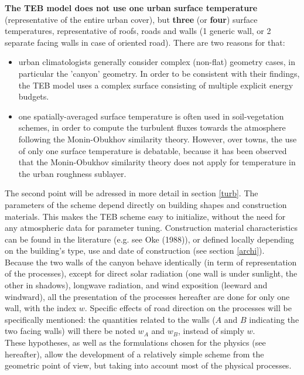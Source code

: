 {\bf The TEB model
does not use one urban surface temperature} (representative of the 
entire urban cover), but {\bf three} (or {\bf four}) surface temperatures,
representative of roofs, roads and walls (1 generic wall, or 2 separate facing walls in case of oriented road). There are two reasons for that:
\begin{itemize}
\item urban climatologists generally consider complex (non-flat) geometry
cases, in particular the 'canyon' geometry. In order to be consistent with
their findings, the TEB model uses a complex surface consisting of
multiple explicit energy budgets.
\item one spatially-averaged surface temperature is often used in
soil-vegetation schemes, in order to compute the turbulent fluxes towards
the atmosphere following the Monin-Obukhov similarity theory.
However, over towns, 
the use of only one surface temperature is debatable, because
it has been observed that the Monin-Obukhov similarity theory does not
apply for temperature in the urban roughness sublayer.
\end{itemize}
The second point will be adressed in more detail in section \ref{turb}.
The parameters of the scheme depend directly on building shapes
and construction materials. This makes the TEB scheme easy to initialize,
without the need for any atmospheric data for parameter tuning. Construction
material characteristics can be found in the literature (e.g. see Oke (1988)\nocite{Oke1988}), or defined locally depending on the building's type, use and date of construction (see section \ref{archi}).
\\

Because the two walls of the canyon behave identically (in term of representation of the processes), except for direct solar radiation (one wall is under sunlight, the other in shadows), longwave radiation, and wind exposition (leeward and windward), all the presentation of the processes hereafter are done for only one wall, with the index $w$. Specific effects of road direction on the processes will be specifically mentioned: the quantities related to the walls ($A$ and $B$ indicating the two facing walls) will there be noted $w_A$ and $w_B$, instead of simply $w$.\\

These hypotheses, as well as the
formulations chosen for the physics (see hereafter), allow
the development of a relatively
simple scheme from the geometric point of view, but taking into account most of the physical processes. \\

